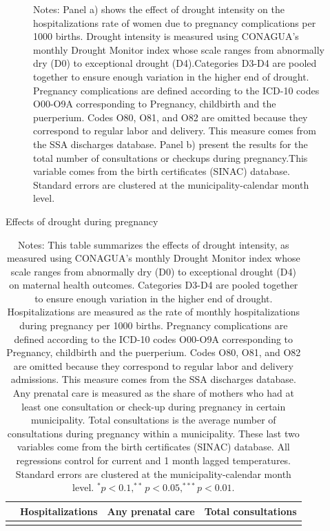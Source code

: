 \documentclass[12pt, oneside]{article}      %
\begin{document}
\begin{figure}[!ht]
    \caption*{\footnotesize{Notes: Panel a) shows the effect of drought intensity on the hospitalizations rate of women due to pregnancy complications per 1000 births. Drought intensity is measured using CONAGUA's monthly Drought Monitor index whose scale ranges from abnormally dry (D0) to exceptional drought (D4).Categories D3-D4 are pooled together to ensure enough variation in the higher end of drought. Pregnancy complications are defined according to the ICD-10 codes O00-O9A corresponding to Pregnancy, childbirth and the puerperium. Codes O80, O81, and O82 are omitted because they correspond to regular labor and delivery. This measure comes from the SSA discharges database. Panel b) present the results for the total number of consultations or checkups during pregnancy.This variable comes from the birth certificates (SINAC) database. Standard errors are clustered at the municipality-calendar month level.}}
\end{figure}

\clearpage
\newpage

\begin{table}[!ht]
\centering
\caption{Effects of drought during pregnancy}\label{tab:effects_mothers_drought}
\fontsize{10pt}{12pt}\selectfont
\begin{tabularx}{\textwidth}{Xcccccc}
\toprule
&\multicolumn{2}{c}{Hospitalizations} &\multicolumn{2}{c}{Any prenatal care} &\multicolumn{2}{c}{Total consultations} \\
\cmidrule(lr){2-3}\cmidrule(lr){4-5}\cmidrule(lr){6-7}

\midrule
 \\

\bottomrule
\end{tabularx}
\caption*{\footnotesize{Notes: This table summarizes the effects of drought intensity, as measured using CONAGUA's monthly Drought Monitor index whose scale ranges from abnormally dry (D0) to exceptional drought (D4) on maternal health outcomes. Categories D3-D4 are pooled together to ensure enough variation in the higher end of drought. Hospitalizations are measured as the rate of monthly hospitalizations during pregnancy per 1000 births. Pregnancy complications are defined according to the ICD-10 codes O00-O9A corresponding to Pregnancy, childbirth and the puerperium. Codes O80, O81, and O82 are omitted because they correspond to regular labor and delivery admissions. This measure comes from the SSA discharges database. Any prenatal care is measured as the share of mothers who had at least one consultation or check-up during pregnancy in certain municipality. Total consultations is the average number of consultations during pregnancy within a municipality. These last two variables come from the birth certificates (SINAC) database. All regressions control for current and 1 month lagged temperatures. Standard errors are clustered at the municipality-calendar month level. $^* p<0.1, ^{**} p<0.05, ^{***} p<0.01$.}}
\end{table}
\end{document}
